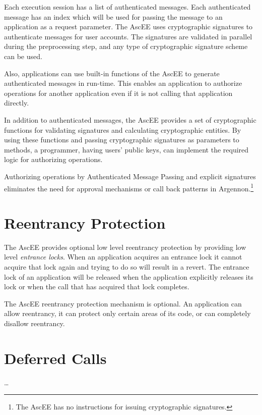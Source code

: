 Each execution session has a list of authenticated messages. Each authenticated message has an index which will be
used for passing the message to an application as a request parameter. The AscEE uses cryptographic signatures to
authenticate messages for user accounts. The signatures are validated in parallel during the
preprocessing step, and any type of cryptographic signature scheme can be used.

Also, applications can use built-in functions of the AscEE to generate authenticated messages in run-time.
This enables an application to authorize operations for another application even if it is not calling that
application directly.

In addition to authenticated messages, the AscEE provides a set of
cryptographic functions for validating signatures and calculating cryptographic entities. By using these functions and
passing cryptographic signatures as parameters to methods, a programmer, having users' public keys, can implement
the required logic for authorizing operations.

Authorizing operations by Authenticated Message Passing and explicit signatures eliminates the need for approval
mechanisms or call back patterns in Argennon.\footnote{The AscEE has no instructions for issuing cryptographic
signatures.}


\section{Reentrancy Protection}\label{sec:reentrancy}

The AscEE provides optional low level reentrancy protection by providing low
level \emph{entrance locks}. When an application acquires an entrance lock it cannot acquire that lock again and trying
to do so will result in a revert. The entrance lock of an application will be released when the application explicitly
releases its lock or when the call that has acquired that lock completes.

The AscEE reentrancy protection mechanism is optional. An application can allow reentrancy, it can protect only certain
areas of its code, or can completely disallow reentrancy.


\section{Deferred Calls}\label{sec:deferred-calls}

\ldots




